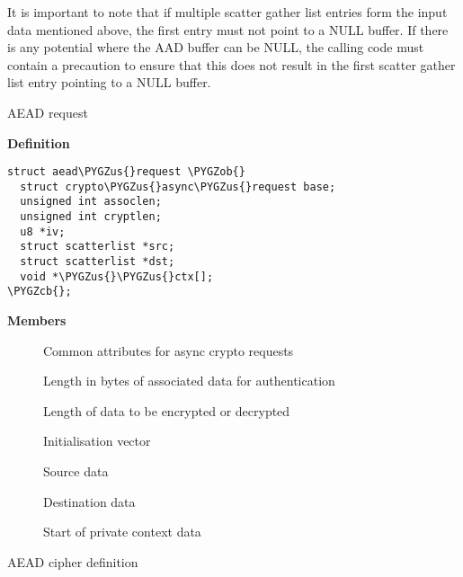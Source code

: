 \documentclass[a4paper,8pt,english]{sphinxmanual}
\def\PYGZus{\char`\_}
\def\PYGZob{\char`\{}
\def\PYGZcb{\char`\}}
\begin{document}
It is important to note that if multiple scatter gather list entries form
the input data mentioned above, the first entry must not point to a NULL
buffer. If there is any potential where the AAD buffer can be NULL, the
calling code must contain a precaution to ensure that this does not result
in the first scatter gather list entry pointing to a NULL buffer.

\begin{fulllineitems}
\label{crypto/api-aead:c.aead_request}
AEAD request

\end{fulllineitems}


\textbf{Definition}

\begin{Verbatim}[commandchars=\\\{\}]
struct aead\PYGZus{}request \PYGZob{}
  struct crypto\PYGZus{}async\PYGZus{}request base;
  unsigned int assoclen;
  unsigned int cryptlen;
  u8 *iv;
  struct scatterlist *src;
  struct scatterlist *dst;
  void *\PYGZus{}\PYGZus{}ctx[];
\PYGZcb{};
\end{Verbatim}

\textbf{Members}
\begin{description}
\item[{}] \leavevmode
Common attributes for async crypto requests

\item[{}] \leavevmode
Length in bytes of associated data for authentication

\item[{}] \leavevmode
Length of data to be encrypted or decrypted

\item[{}] \leavevmode
Initialisation vector

\item[{}] \leavevmode
Source data

\item[{}] \leavevmode
Destination data

\item[{}] \leavevmode
Start of private context data

\end{description}

\begin{fulllineitems}
\label{crypto/api-aead:c.aead_alg}
AEAD cipher definition

\end{fulllineitems}
\end{document}
